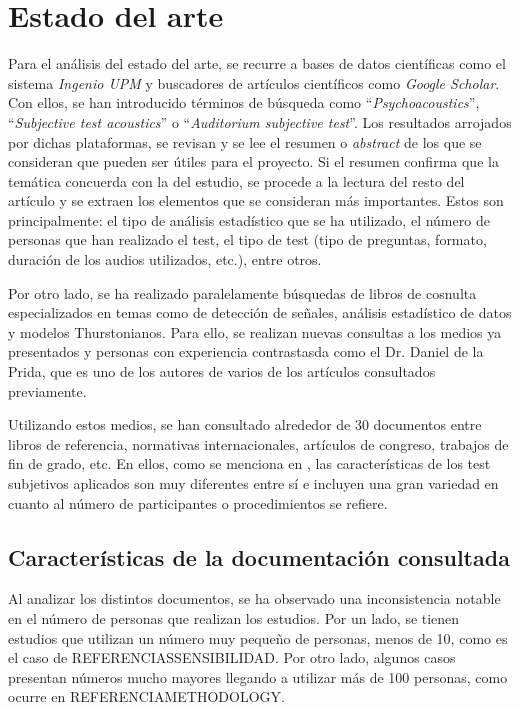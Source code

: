 \documentclass[11pt,a4paper]{book}
\author{Víctor de Tejada Molera}
\begin{document}
\chapter{Estado del arte}
    Para el análisis del estado del arte, se recurre a bases de datos científicas como el sistema \textit{Ingenio UPM} y buscadores de artículos científicos como \textit{Google Scholar}. Con ellos, se han introducido términos de búsqueda como ``\textit{Psychoacoustics}'', ``\textit{Subjective test acoustics}'' o ``\textit{Auditorium subjective test}''. Los resultados arrojados por dichas plataformas, se revisan y se lee el resumen o \textit{abstract} de los que se consideran que pueden ser útiles para el proyecto. Si el resumen confirma que la temática concuerda con la del estudio, se procede a la lectura del resto del artículo y se extraen los elementos que se consideran más importantes. Estos son principalmente: el tipo de análisis estadístico que se ha utilizado, el número de personas que han realizado el test, el tipo de test (tipo de preguntas, formato, duración de los audios utilizados, etc.), entre otros.
    
    Por otro lado, se ha realizado paralelamente búsquedas de libros de cosnulta especializados en temas como de detección de señales, análisis estadístico de datos y modelos Thurstonianos. Para ello, se realizan nuevas consultas a los medios ya presentados y personas con experiencia contrastasda como el Dr. Daniel de la Prida, que es uno de los autores de varios de los artículos consultados previamente.\newline
    
    Utilizando estos medios, se han consultado alrededor de 30 documentos entre libros de referencia, normativas internacionales, artículos de congreso, trabajos de fin de grado, etc. En ellos, como se menciona en \cite{Tejada2020}, las características de los test subjetivos aplicados son muy diferentes entre sí e incluyen una gran variedad en cuanto al número de participantes o procedimientos se refiere.
    
    \section{Características de la documentación consultada}
    
    Al analizar los distintos documentos, se ha observado una inconsistencia notable en el número de personas que realizan los estudios. Por un lado, se tienen estudios que utilizan un número muy pequeño de personas, menos de 10, como es el caso de REFERENCIASSENSIBILIDAD. Por otro lado, algunos casos presentan números mucho mayores llegando a utilizar más de 100 personas, como ocurre en REFERENCIAMETHODOLOGY. 
    
\end{document}
